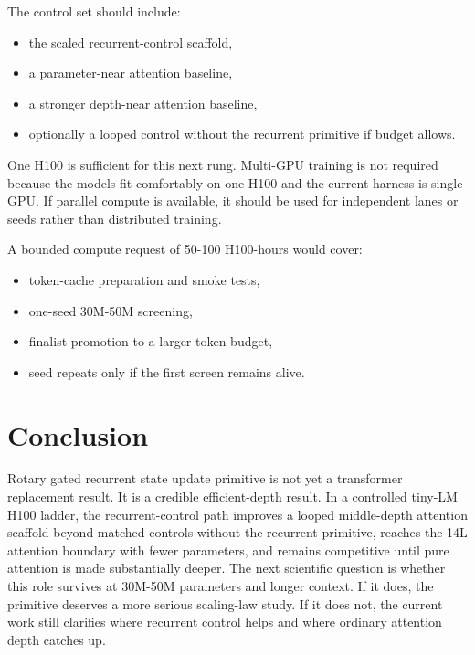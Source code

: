 \documentclass[11pt]{article}
\newcommand{\Primitive}{Rotary gated recurrent state update primitive}
\begin{document}
The control set should include:

\begin{itemize}
  \item the scaled recurrent-control scaffold,
  \item a parameter-near attention baseline,
  \item a stronger depth-near attention baseline,
  \item optionally a looped control without the recurrent primitive if budget
    allows.
\end{itemize}

One H100 is sufficient for this next rung. Multi-GPU training is not required
because the models fit comfortably on one H100 and the current harness is
single-GPU. If parallel compute is available, it should be used for independent
lanes or seeds rather than distributed training.

A bounded compute request of 50-100 H100-hours would cover:

\begin{itemize}
  \item token-cache preparation and smoke tests,
  \item one-seed 30M-50M screening,
  \item finalist promotion to a larger token budget,
  \item seed repeats only if the first screen remains alive.
\end{itemize}

\section{Conclusion}

\Primitive{} is not yet a transformer replacement result. It is a credible
efficient-depth result. In a controlled tiny-LM H100 ladder, the
recurrent-control path improves a looped middle-depth attention scaffold beyond
matched controls without the recurrent primitive, reaches the 14L attention
boundary with fewer parameters, and remains competitive until pure attention is
made substantially deeper. The next
scientific question is whether this role survives at 30M-50M parameters and
longer context. If it does, the primitive deserves a more serious scaling-law
study. If it does not, the current work still clarifies where recurrent control
helps and where ordinary attention depth catches up.



\end{document}
